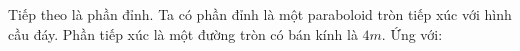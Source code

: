 \documentclass[preview]{standalone}
\begin{document}
\begin{center}
Tiếp theo là phần đỉnh. Ta có phần đỉnh là một paraboloid tròn tiếp xúc với hình cầu đáy. Phần tiếp xúc là một đường tròn có bán kính là $4 m$. Ứng với:
\end{center}
\end{document}
